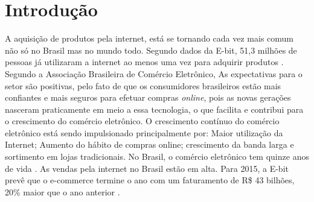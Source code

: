 
\chapter{Introdução}

A aquisição de produtos pela internet, está se tornando cada vez mais comum não só no Brasil mas no mundo todo. Segundo dados da E-bit, 51,3 milhões de pessoas já utilizaram a internet ao menos uma vez para adquirir produtos \cite{Campi2014}. Segundo a Associação Brasileira de Comércio Eletrônico, As expectativas para o setor são positivas, pelo fato de que os consumidores brasileiros estão mais confiantes e mais seguros para efetuar compras \textit{online}, pois as novas gerações nasceram praticamente em meio a essa tecnologia, o que facilita e contribui para o crescimento do comércio eletrônico. O crescimento contínuo do comércio eletrônico está sendo impulsionado principalmente por: Maior utilização da Internet; Aumento do hábito de compras online; crescimento da banda larga e sortimento em lojas tradicionais. No Brasil, o comércio eletrônico tem quinze anos de vida \nocite{DIGiorgi2013}. As vendas pela internet no Brasil estão em alta. Para 2015, a E-bit prevê que o e-commerce termine o ano com um faturamento de R\$ 43 bilhões, 20\% maior que o ano anterior \cite{E-Bit2015}.
